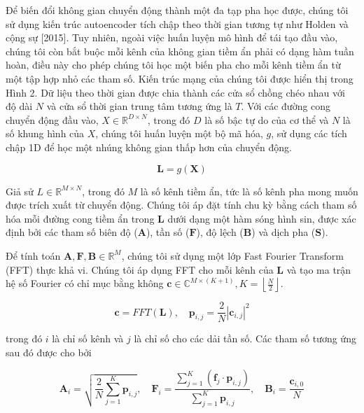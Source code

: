 Để biến đổi không gian chuyển động thành một đa tạp pha học được, chúng tôi sử dụng kiến trúc autoencoder tích chập theo thời gian tương tự như Holden và cộng sự [2015]. Tuy nhiên, ngoài việc huấn luyện mô hình để tái tạo đầu vào, chúng tôi còn bắt buộc mỗi kênh của không gian tiềm ẩn phải có dạng hàm tuần hoàn, điều này cho phép chúng tôi học một biến pha cho mỗi kênh tiềm ẩn từ một tập hợp nhỏ các tham số. Kiến trúc mạng của chúng tôi được hiển thị trong Hình 2. Dữ liệu theo thời gian được chia thành các cửa sổ chồng chéo nhau với độ dài $N$ và cửa sổ thời gian trung tâm tương ứng là $T$. Với các đường cong chuyển động đầu vào, $X \in \mathbb{R}^{D \times N}$, trong đó $D$ là số bậc tự do của cơ thể và $N$ là số khung hình của $X$, chúng tôi huấn luyện một bộ mã hóa, $g$, sử dụng các tích chập 1D để học một nhúng không gian thấp hơn của chuyển động.


\begin{equation}
	\label{eq:encoder}
	\mathbf{L} = g( \textbf{X} )
\end{equation}

Giả sử $L \in \mathbb{R}^{M \times N}$, trong đó $M$ là số kênh tiềm ẩn, tức là số kênh pha mong muốn được trích xuất từ chuyển động. Chúng tôi áp đặt tính chu kỳ bằng cách tham số hóa mỗi đường cong tiềm ẩn trong $\mathbf{L}$ dưới dạng một hàm sóng hình sin, được xác định bởi các tham số biên độ ($\mathbf{A}$), tần số ($\mathbf{F}$), độ lệch ($\mathbf{B}$) và dịch pha ($\mathbf{S}$).

Để tính toán $\mathbf{A}, \mathbf{F}, \mathbf{B} \in \mathbb{R}^{M}$, chúng tôi sử dụng một lớp Fast Fourier Transform (FFT) thực khả vi. Chúng tôi áp dụng FFT cho mỗi kênh của $\mathbf{L}$ và tạo ma trận hệ số Fourier có chỉ mục bằng không $\mathbf{c} \in \mathbb{C}^{M \times (K+1)}, K=\left\lfloor \frac{N}{2} \right\rfloor$.

\begin{equation}
	\label{eq:fft}
	\mathbf{c}=F F T(\mathbf{L}), \quad \mathbf{p}_{i, j}=\frac{2}{N}\left|\mathbf{c}_{i, j}\right|^2
\end{equation}

trong đó $i$ là chỉ số kênh và $j$ là chỉ số cho các dải tần số. Các tham số tương ứng sau đó được cho bởi


\begin{equation}
	\label{eq:PhaseExtraction}
	\mathbf{A}_i=\sqrt{\frac{2}{N} \sum_{j=1}^K \mathbf{p}_{i, j}}, \quad \mathbf{F}_i=\frac{\sum_{j=1}^K\left(\mathbf{f}_j \cdot \mathbf{p}_{i, j}\right)}{\sum_{j=1}^K \mathbf{p}_{i, j}}, \quad \mathbf{B}_i=\frac{\mathbf{c}_{i, 0}}{N}
\end{equation}

